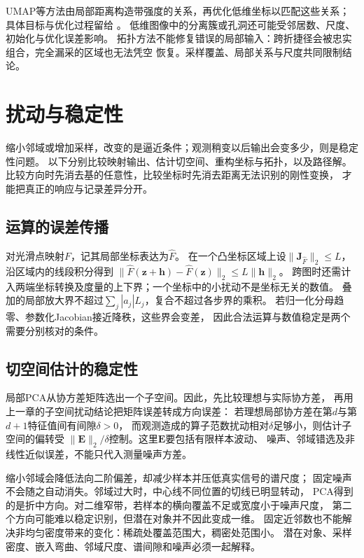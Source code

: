 UMAP等方法由局部距离构造带强度的关系，再优化低维坐标以匹配这些关系；
具体目标与优化过程留给
。
低维图像中的分离簇或孔洞还可能受邻居数、尺度、初始化与优化误差影响。
拓扑方法不能修复错误的局部输入：跨折捷径会被忠实组合，完全漏采的区域也无法凭空
恢复。采样覆盖、局部关系与尺度共同限制结论。

\section{扰动与稳定性}
\label{sec:geometry-stability}

缩小邻域或增加采样，改变的是逼近条件；观测稍变以后输出会变多少，则是稳定性问题。
以下分别比较映射输出、估计切空间、重构坐标与拓扑，以及路径解。
比较方向时先消去基的任意性，比较坐标时先消去距离无法识别的刚性变换，
才能把真正的响应与记录差异分开。

\subsection{运算的误差传播}
\label{sec:geometry-operation-stability}

对光滑点映射$F$，记其局部坐标表达为$\widehat F$。
在一个凸坐标区域上设$\lVert\bm J_{\widehat F}\rVert_2\leq L$，
沿区域内的线段积分得到
$\lVert\widehat F(\bm z+\bm h)-\widehat F(\bm z)\rVert_2
\leq L\lVert\bm h\rVert_2$。
跨图时还需计入两端坐标转换及度量的上下界；一个坐标中的小扰动不是坐标无关的数值。
叠加的局部放大界不超过$\sum_j|a_j|L_j$，复合不超过各步界的乘积。
若归一化分母趋零、参数化Jacobian接近降秩，这些界会变差，
因此合法运算与数值稳定是两个需要分别核对的条件。

\subsection{切空间估计的稳定性}
\label{sec:geometry-tangent-estimate-stability}

局部PCA从协方差矩阵选出一个子空间。因此，先比较理想与实际协方差，
再用上一章的子空间扰动结论把矩阵误差转成方向误差：
若理想局部协方差在第$d$与第$d+1$特征值间有间隙$\delta>0$，
而观测造成的算子范数扰动相对$\delta$足够小，则估计子空间的偏转受
$\lVert\bm E\rVert_2/\delta$控制。这里$\bm E$要包括有限样本波动、
噪声、邻域错选及非线性近似误差，不能只代入测量噪声方差。

缩小邻域会降低法向二阶偏差，却减少样本并压低真实信号的谱尺度；
固定噪声不会随之自动消失。邻域过大时，中心线不同位置的切线已明显转动，
PCA得到的是折中方向。对二维窄带，若样本的横向覆盖不足或宽度小于噪声尺度，
第二个方向可能难以稳定识别，但潜在对象并不因此变成一维。
固定近邻数也不能解决非均匀密度带来的变化：稀疏处覆盖范围大，稠密处范围小。
潜在对象、采样密度、嵌入弯曲、邻域尺度、谱间隙和噪声必须一起解释。


